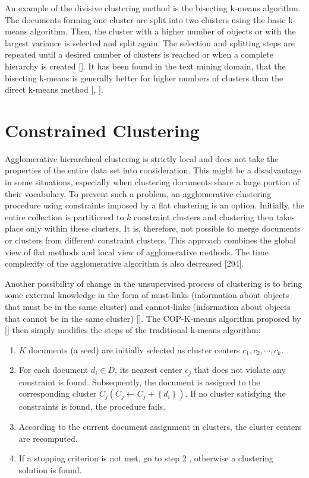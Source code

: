 An example of the divisive clustering method is the bisecting k-means algorithm. The documents forming one cluster are split into two clusters using the basic k-means algorithm. Then, the cluster with a higher number of objects or with the largest variance is selected and split again. The selection and splitting steps are repeated until a desired number of clusters is reached or when a complete hierarchy is created [\cite{ref256}]. It has been found in the text mining domain, that the bisecting k-means is generally better for higher numbers of clusters than the direct k-means method [\cite{ref141}, \cite{ref294}].

\section{Constrained Clustering}
Agglomerative hierarchical clustering is strictly local and does not take the properties of the entire data set into consideration. This might be a disadvantage in
some situations, especially when clustering documents share a large portion of their vocabulary. To prevent such a problem, an agglomerative clustering procedure using constraints imposed by a flat clustering is an option. Initially, the entire collection is partitioned to $k$ constraint clusters and clustering then takes place only within these clusters. It is, therefore, not possible to merge documents or clusters from different constraint clusters. This approach combines the global view of flat methods and local view of agglomerative methods. The time complexity of the agglomerative algorithm is also decreased [294].

Another possibility of change in the unsupervised process of clustering is to bring some external knowledge in the form of must-links (information about objects that must be in the same cluster) and cannot-links (information about objects that cannot be in the same cluster) [\cite{ref18}]. The COP-K-means algorithm proposed by [\cite{ref272}] then simply modifies the steps of the traditional k-means algorithm:

\begin{enumerate}
  \item $K$ documents (a seed) are initially selected as cluster centers $c_{1}, c_{2}, \cdots, c_{k}$.
  \item For each document $d_{i} \in D$, its nearest center $c_{j}$ that does not violate any constraint is found. Subsequently, the document is assigned to the corresponding cluster $C_{j}\left(C_{j} \leftarrow C_{j}+\left\{d_{i}\right\}\right)$. If no cluster satisfying the constraints is found, the procedure fails.
  \item According to the current document assignment in clusters, the cluster centers are recomputed.
  \item If a stopping criterion is not met, go to step 2 , otherwise a clustering solution is found.
\end{enumerate}

